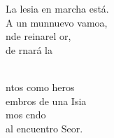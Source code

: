 \documentclass[12pt]{article}
\begin{document}
\begin{multicols*}{2}
\begin{cancion}
	La lesia en marcha está.\\
	A un munnuevo vamoa,\\
	nde reinarel or,\\
	de rnará la\\\jump\\
	\begin{chorus}%
	ntos como heros\\
	embros de una Isia\\
	mos cndo\\
	al encuentro  Seor.\\
	\end{chorus}%
	\jump\\
\end{cancion}%


\end{multicols*}
\end{document}
